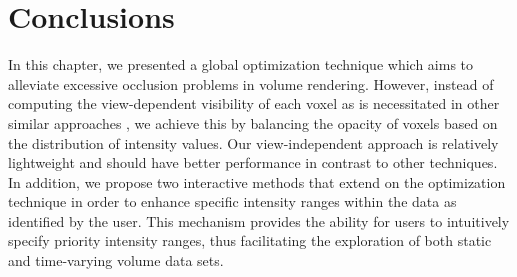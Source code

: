 \section{Conclusions}

In this chapter, we presented a global optimization technique which aims to alleviate excessive occlusion problems in volume rendering. However, instead of computing the view-dependent visibility of each voxel as is necessitated in other similar approaches \cite{correa_visibility_2011} \cite{ruiz_automatic_2011}, we achieve this by balancing the opacity of voxels based on the distribution of intensity values. Our view-independent approach is relatively lightweight and should have better performance in contrast to other techniques.
In addition, we propose two interactive methods that extend on the optimization technique in order to enhance specific intensity ranges within the data as identified by the user.
This mechanism provides the ability for users to intuitively specify priority intensity ranges, thus facilitating the exploration of both static and time-varying volume data sets.



